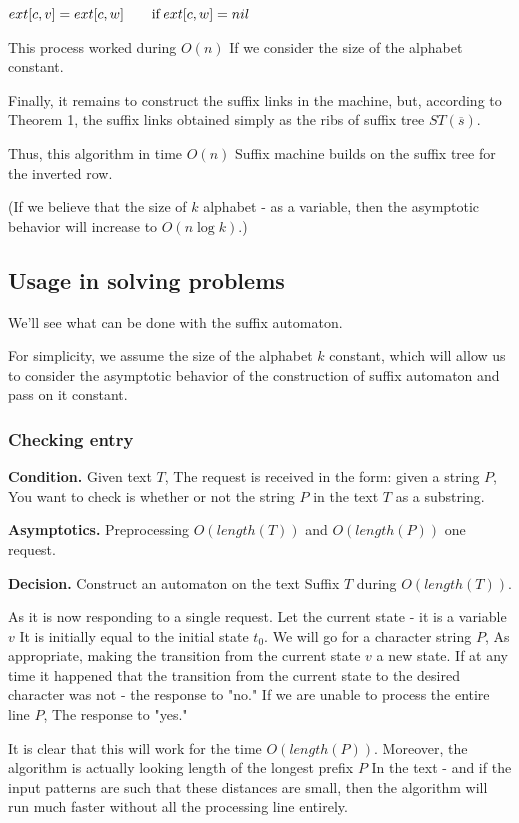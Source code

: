 $ext[c,v]=ext[c,w]\qquad{\rm if}\, ext[c,w]=nil$

This process worked during $O (n)$ If we consider the size of the alphabet constant.

Finally, it remains to construct the suffix links in the machine, but, according to Theorem 1, the suffix links obtained simply as the ribs of suffix tree $ST (\overline {s})$.

Thus, this algorithm in time $O (n)$ Suffix machine builds on the suffix tree for the inverted row.

(If we believe that the size of $k$ alphabet - as a variable, then the asymptotic behavior will increase to $O (n \log k)$.)

\subsection{ Usage in solving problems }

We'll see what can be done with the suffix automaton.

For simplicity, we assume the size of the alphabet $k$ constant, which will allow us to consider the asymptotic behavior of the construction of suffix automaton and pass on it constant.

\subsubsection{ Checking entry }

\textbf{Condition.} Given text $T$, The request is received in the form: given a string $P$, You want to check is whether or not the string $P$ in the text $T$ as a substring.

\textbf{Asymptotics.} Preprocessing $O (length (T))$ and $O (length (P))$ one request.

\textbf{Decision.} Construct an automaton on the text Suffix $T$ during $O (length (T))$.

As it is now responding to a single request. Let the current state - it is a variable $v$ It is initially equal to the initial state $t_0$. We will go for a character string $P$, As appropriate, making the transition from the current state $v$ a new state. If at any time it happened that the transition from the current state to the desired character was not - the response to "no." If we are unable to process the entire line $P$, The response to "yes."

It is clear that this will work for the time $O (length (P))$. Moreover, the algorithm is actually looking length of the longest prefix $P$ In the text - and if the input patterns are such that these distances are small, then the algorithm will run much faster without all the processing line entirely.

